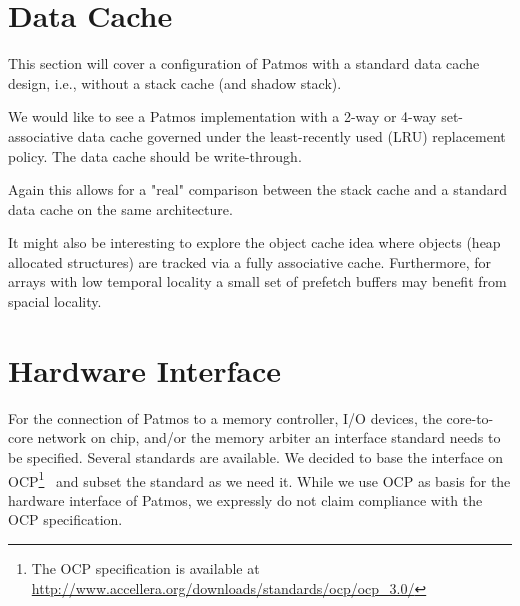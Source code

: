 \documentclass[a4paper,fontsize=10pt,twoside,DIV15,BCOR12mm,headinclude=true,footinclude=false,pagesize,bibtotoc]{scrbook}
\newcommand{\comment}[3]{

\textsf{\textbf{#1}} {\color{#3}#2}}
\newcommand{\martin}[1]{\comment{Martin}{#1}{Blue}}
\newcommand{\fb}[1]{\comment{Florian}{#1}{Emerald}}
\renewcommand{\martin}[1]{}
\renewcommand{\fb}[1]{}
\begin{document}
\fb{For a reasonable comparison we still need a reasonable baseline for the
method cache. Please add a section on the standard instruction cache design,
issues you would like to see addressed there, and potential amendments to the
ISA with respect to the current proposal with a method cache. Thanks!}

\martin{Agreed that comparison between FIFO M\$ and plain I\$ is one of
the project goals. However, before doing the HW support for both I would
like to see the comparison within the WCET analysis. I think there is an
empty paper start here in this SVN under 2012/mceval/mceval.tex ;-)}

\section{Data Cache}

This section will cover a configuration of Patmos with a standard data cache design, i.e., without a stack cache (and shadow stack).

We would like to see a Patmos implementation with a 2-way or 4-way set-associative data cache governed under the least-recently used (LRU) replacement policy.
The data cache should be write-through.

Again this allows for a "real" comparison between the stack cache and a standard data cache on the same architecture.

It might also be interesting to explore the object cache idea \cite{jop:ocache, jop:ocwcet:ccpe} where objects (heap allocated structures) are tracked via
a fully associative cache. Furthermore, for arrays with low temporal locality
a small set of prefetch buffers may benefit from spacial locality.

\section{Hardware Interface}

For the connection of Patmos to a memory controller, I/O devices, the
core-to-core network on chip, and/or the memory arbiter an interface
standard needs to be specified. Several standards are available.  We
decided to base the interface on OCP\footnote{The OCP specification is
  available at \url{http://www.accellera.org/downloads/standards/ocp/ocp_3.0/}}~\cite{ocp:spec}
and subset the standard as we need it. While we use OCP as basis for
the hardware interface of Patmos, we expressly do not claim
compliance with the OCP specification.
\end{document}
